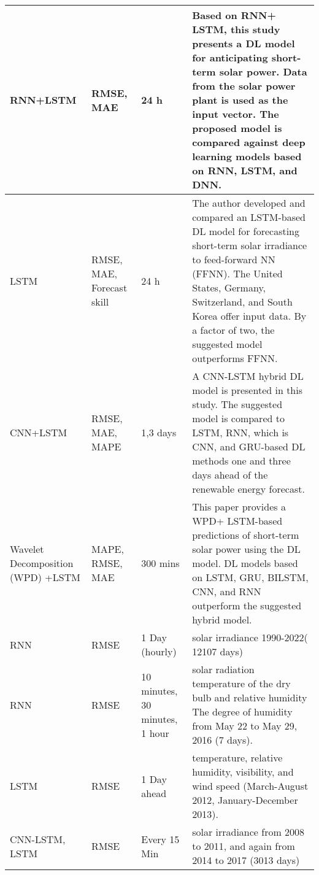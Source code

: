 \begin{longtable}[c]{|p{}|p{}|p{}|p{}|}
RNN+LSTM\cite{hu2021short} & RMSE, MAE & 24 h &Based on RNN+ LSTM, this study presents a DL model for anticipating short-term solar power. Data from the solar power plant is used as the input vector. The proposed model is compared against deep learning models based on RNN, LSTM, and DNN. \\\hline
LSTM\cite{husein2019day} & RMSE, MAE, Forecast skill & 24 h &The author developed and compared an LSTM-based DL model for forecasting short-term solar irradiance to feed-forward NN (FFNN). The United States, Germany, Switzerland, and South Korea offer input data. By a factor of two, the suggested model outperforms FFNN. \\ \hline
CNN+LSTM\cite{de2019solar} &RMSE, MAE, MAPE & 1,3 days & A CNN-LSTM hybrid DL model is presented in this study. The suggested model is compared to LSTM, RNN, which is CNN, and GRU-based DL methods one and three days ahead of the renewable energy forecast. \\ \hline
Wavelet Decomposition (WPD) +LSTM\cite{li2020hybrid} &MAPE, RMSE, MAE & 300 mins &This paper provides a WPD+ LSTM-based predictions of short-term solar power using the DL model. DL models based on LSTM, GRU, BILSTM, CNN, and RNN outperform the suggested hybrid model. \\ \hline
RNN\cite{cao2005forecast} &RMSE & 1 Day (hourly) & solar irradiance 1990-2022( 12107 days) \\ \hline
RNN\cite{niu2017recurrent} & RMSE & 10 minutes, 30 minutes, 1 hour & solar radiation temperature of the dry bulb and relative humidity The degree of humidity from May 22 to May 29, 2016 (7 days). \\ \hline
LSTM\cite{qing2018hourly} & RMSE & 1 Day ahead &temperature, relative humidity, visibility, and wind speed (March-August 2012, January-December 2013). \\ \hline
CNN-LSTM, LSTM\cite{wang2018wavelet} & RMSE & Every 15 Min & solar irradiance from 2008 to 2011, and again from 2014 to 2017 (3013 days) \\
\hline
\end{longtable}

